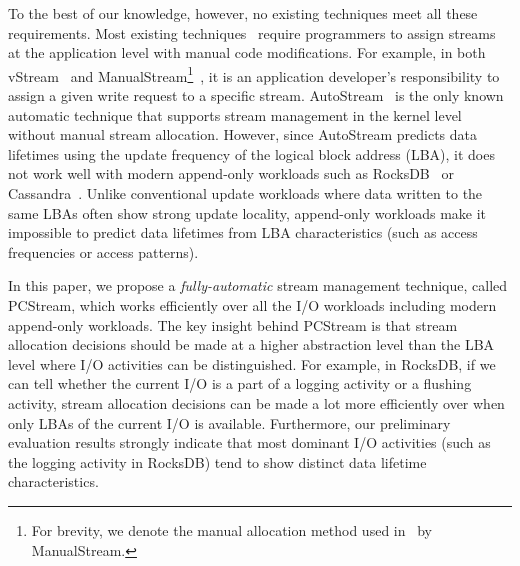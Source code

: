 To the best of our knowledge, however, no existing techniques meet all these requirements.  
Most existing techniques~\cite{MultiStream, Level, FStream, vStream} require 
programmers to assign streams at the application level with manual code modifications.
For example,  
in both \textsf{\small vStream}~\cite{vStream} and
\textsf{\small ManualStream}\footnote{For brevity, we denote the 
manual allocation method used in~\cite{MultiStream} by \textsf{\scriptsize ManualStream}.}~\cite{MultiStream}, 
it is an application developer's 
responsibility to assign a given write request to a specific stream.
\textsf{\small AutoStream}~\cite{AutoStream} is the only known automatic technique 
that supports stream management in the kernel level without manual stream allocation.
However, since \textsf{\small AutoStream} predicts data lifetimes using the update frequency 
of the logical block address (LBA), it does not work well with modern append-only workloads 
such as RocksDB~\cite{RocksDB} or Cassandra~\cite{Cassandra}.  
Unlike conventional update workloads where data written to the same LBAs 
often show strong update locality, 
append-only workloads make it impossible to predict data lifetimes 
from LBA characteristics (such as access frequencies or access patterns).  

In this paper, we propose a {\it fully-automatic} stream management technique, 
called \textsf{\small PCStream}, which works efficiently over all the I/O workloads including modern 
append-only workloads.   
The key insight behind \textsf{\small PCStream} is that stream allocation decisions should be made 
at a higher abstraction level than the LBA level where I/O 
activities can be distinguished.
For example, in RocksDB, if we can tell whether the current I/O is a part of 
a logging activity or a flushing activity, stream allocation decisions can be made 
a lot more efficiently over when only LBAs of the current I/O is
available.   
Furthermore, 
our preliminary evaluation results strongly indicate that most 
dominant I/O activities (such as the logging activity in RocksDB) tend to show distinct
data lifetime characteristics.

